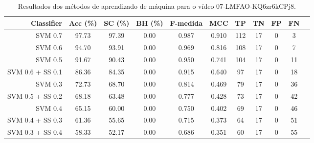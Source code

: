 \begin{table}[!htb]
\centering
\caption{Resultados dos métodos de aprendizado de máquina para o vídeo 07-LMFAO-KQ6zr6kCPj8.}
\label{tab:07-LMFAO-KQ6zr6kCPj8}
\begin{tabular}{r|c|c|c|c|c|c|c|c|c|c}
\hline\hline
Classifier & Acc (\%) & SC (\%) & BH (\%) & F-medida & MCC & TP & TN & FP & FN \\ \hline
SVM 0.7 & 97.73 & 97.39 & 0.00 & 0.987 & 0.910 & 112 & 17 & 0 & 3 \\ 
SVM 0.6 & 94.70 & 93.91 & 0.00 & 0.969 & 0.816 & 108 & 17 & 0 & 7 \\ 
SVM 0.5 & 91.67 & 90.43 & 0.00 & 0.950 & 0.741 & 104 & 17 & 0 & 11 \\ 
SVM 0.6 + SS 0.1 & 86.36 & 84.35 & 0.00 & 0.915 & 0.640 & 97 & 17 & 0 & 18 \\ 
SVM 0.3 & 72.73 & 68.70 & 0.00 & 0.814 & 0.469 & 79 & 17 & 0 & 36 \\ 
SVM 0.5 + SS 0.2 & 68.18 & 63.48 & 0.00 & 0.777 & 0.428 & 73 & 17 & 0 & 42 \\ 
SVM 0.4 & 65.15 & 60.00 & 0.00 & 0.750 & 0.402 & 69 & 17 & 0 & 46 \\ 
SVM 0.4 + SS 0.3 & 61.36 & 55.65 & 0.00 & 0.715 & 0.373 & 64 & 17 & 0 & 51 \\ 
SVM 0.3 + SS 0.4 & 58.33 & 52.17 & 0.00 & 0.686 & 0.351 & 60 & 17 & 0 & 55 \\ 
\hline\hline
\end{tabular}
\end{table}
